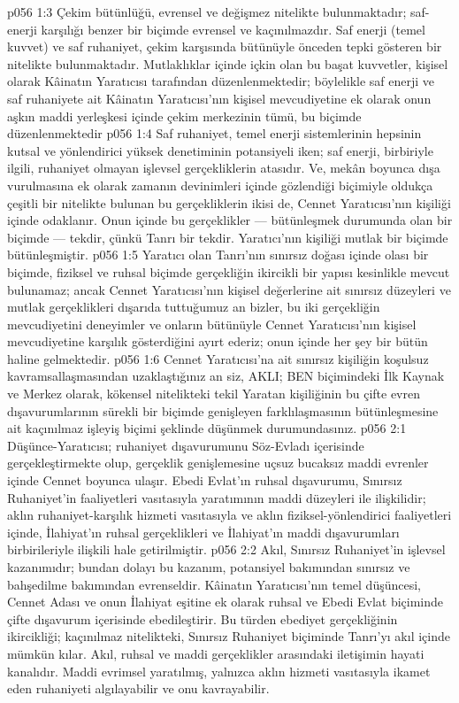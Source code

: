 \vs p056 1:3 Çekim bütünlüğü, evrensel ve değişmez nitelikte bulunmaktadır; saf\hyp{}enerji karşılığı benzer bir biçimde evrensel ve kaçınılmazdır. Saf enerji (temel kuvvet) ve saf ruhaniyet, çekim karşısında bütünüyle önceden tepki gösteren bir nitelikte bulunmaktadır. Mutlaklıklar içinde içkin olan bu başat kuvvetler, kişisel olarak Kâinatın Yaratıcısı tarafından düzenlenmektedir; böylelikle saf enerji ve saf ruhaniyete ait Kâinatın Yaratıcısı’nın kişisel mevcudiyetine ek olarak onun aşkın maddi yerleşkesi içinde çekim merkezinin tümü, bu biçimde düzenlenmektedir
\vs p056 1:4 Saf ruhaniyet, temel enerji sistemlerinin hepsinin kutsal ve yönlendirici yüksek denetiminin potansiyeli iken; saf enerji, birbiriyle ilgili, ruhaniyet olmayan işlevsel gerçekliklerin atasıdır. Ve, mekân boyunca dışa vurulmasına ek olarak zamanın devinimleri içinde gözlendiği biçimiyle oldukça çeşitli bir nitelikte bulunan bu gerçekliklerin ikisi de, Cennet Yaratıcısı’nın kişiliği içinde odaklanır. Onun içinde bu gerçeklikler --- bütünleşmek durumunda olan bir biçimde --- tekdir, çünkü Tanrı bir tekdir. Yaratıcı’nın kişiliği mutlak bir biçimde bütünleşmiştir.
\vs p056 1:5 Yaratıcı olan Tanrı’nın sınırsız doğası içinde olası bir biçimde, fiziksel ve ruhsal biçimde gerçekliğin ikircikli bir yapısı kesinlikle mevcut bulunamaz; ancak Cennet Yaratıcısı’nın kişisel değerlerine ait sınırsız düzeyleri ve mutlak gerçeklikleri dışarıda tuttuğumuz an bizler, bu iki gerçekliğin mevcudiyetini deneyimler ve onların bütünüyle Cennet Yaratıcısı’nın kişisel mevcudiyetine karşılık gösterdiğini ayırt ederiz; onun içinde her şey bir bütün haline gelmektedir.
\vs p056 1:6 Cennet Yaratıcısı’na ait sınırsız kişiliğin koşulsuz kavramsallaşmasından uzaklaştığınız an siz, AKLI; BEN biçimindeki İlk Kaynak ve Merkez olarak, kökensel nitelikteki tekil Yaratan kişiliğinin bu çifte evren dışavurumlarının sürekli bir biçimde genişleyen farklılaşmasının bütünleşmesine ait kaçınılmaz işleyiş biçimi şeklinde düşünmek durumundasınız.
\vs p056 2:1 Düşünce\hyp{}Yaratıcısı; ruhaniyet dışavurumunu Söz\hyp{}Evladı içerisinde gerçekleştirmekte olup, gerçeklik genişlemesine uçsuz bucaksız maddi evrenler içinde Cennet boyunca ulaşır. Ebedi Evlat’ın ruhsal dışavurumu, Sınırsız Ruhaniyet’in faaliyetleri vasıtasıyla yaratımının maddi düzeyleri ile ilişkilidir; aklın ruhaniyet\hyp{}karşılık hizmeti vasıtasıyla ve aklın fiziksel\hyp{}yönlendirici faaliyetleri içinde, İlahiyat’ın ruhsal gerçeklikleri ve İlahiyat’ın maddi dışavurumları birbirileriyle ilişkili hale getirilmiştir.
\vs p056 2:2 Akıl, Sınırsız Ruhaniyet’in işlevsel kazanımıdır; bundan dolayı bu kazanım, potansiyel bakımından sınırsız ve bahşedilme bakımından evrenseldir. Kâinatın Yaratıcısı’nın temel düşüncesi, Cennet Adası ve onun İlahiyat eşitine ek olarak ruhsal ve Ebedi Evlat biçiminde çifte dışavurum içerisinde ebedileştirir. Bu türden ebediyet gerçekliğinin ikircikliği; kaçınılmaz nitelikteki, Sınırsız Ruhaniyet biçiminde Tanrı’yı akıl içinde mümkün kılar. Akıl, ruhsal ve maddi gerçeklikler arasındaki iletişimin hayati kanalıdır. Maddi evrimsel yaratılmış, yalnızca aklın hizmeti vasıtasıyla ikamet eden ruhaniyeti algılayabilir ve onu kavrayabilir.
